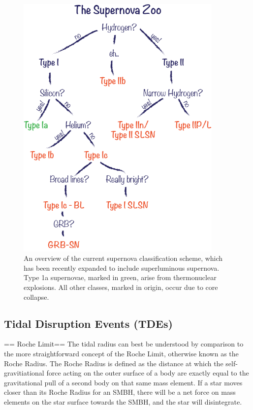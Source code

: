 \documentclass[]{article}
\begin{document}
 \begin{figure}[!ht]
	\centering \includegraphics[width=0.9\textwidth]{sn_zoo-1}
	\caption{An overview of the current supernova classification scheme, which has been recently expanded to include superluminous supernova. Type 1a supernovae, marked in green, arise from thermonuclear explosions. All other classes, marked in origin, occur due to core collapse.}
	\label{fig:snzoo}
\end{figure}

\subsection{Tidal Disruption Events (TDEs)}
== Roche Limit==
The tidal radius can best be understood by comparison to the more straightforward concept of the Roche Limit, otherwise known as the Roche Radius. The Roche Radius is defined as the distance at which the self-gravitiational force acting on the outer surface of a body are exactly equal to the gravitational pull of a second body on that same mass element. If a star moves closer than its Roche Radius for an SMBH, there will be a net force on mass elements on the star surface towards the SMBH, and the star will disintegrate.
\end{document}
